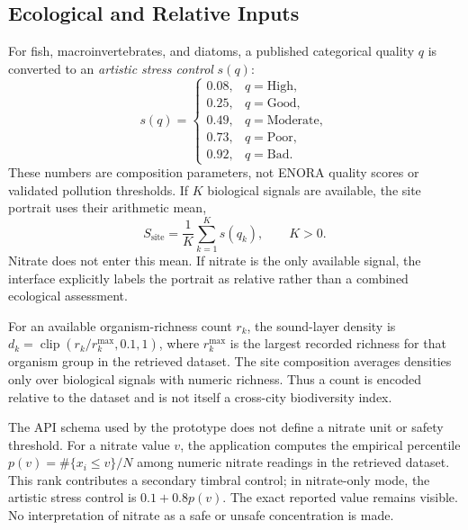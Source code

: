 \documentclass[conference]{IEEEtran}
\begin{document}
\subsection{Ecological and Relative Inputs}
For fish, macroinvertebrates, and diatoms, a published categorical quality $q$ is converted to an \emph{artistic stress control} $s(q)$:
\begin{equation}
s(q)=\begin{cases}
0.08,&q=\text{High},\\
0.25,&q=\text{Good},\\
0.49,&q=\text{Moderate},\\
0.73,&q=\text{Poor},\\
0.92,&q=\text{Bad}.
\end{cases}
\label{eq:quality}
\end{equation}
These numbers are composition parameters, not ENORA quality scores or validated pollution thresholds. If $K$ biological signals are available, the site portrait uses their arithmetic mean,
\begin{equation}
S_{\mathrm{site}}=\frac{1}{K}\sum_{k=1}^{K}s(q_k), \qquad K>0.
\label{eq:site}
\end{equation}
Nitrate does not enter this mean. If nitrate is the only available signal, the interface explicitly labels the portrait as relative rather than a combined ecological assessment.

For an available organism-richness count $r_k$, the sound-layer density is $d_k=\operatorname{clip}(r_k/r_k^{\max},0.1,1)$, where $r_k^{\max}$ is the largest recorded richness for that organism group in the retrieved dataset. The site composition averages densities only over biological signals with numeric richness. Thus a count is encoded relative to the dataset and is not itself a cross-city biodiversity index.

The API schema used by the prototype does not define a nitrate unit or safety threshold. For a nitrate value $v$, the application computes the empirical percentile $p(v)=\#\{x_i\leq v\}/N$ among numeric nitrate readings in the retrieved dataset. This rank contributes a secondary timbral control; in nitrate-only mode, the artistic stress control is $0.1+0.8p(v)$. The exact reported value remains visible. No interpretation of nitrate as a safe or unsafe concentration is made.
\end{document}
